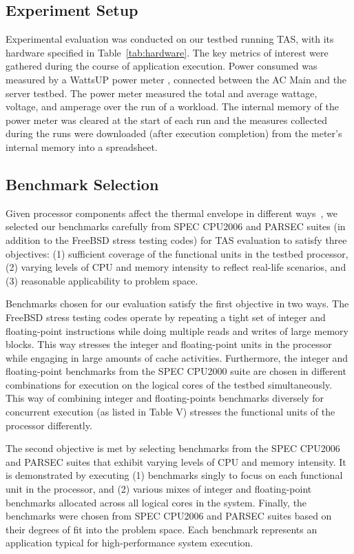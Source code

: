 \documentclass[times, 10pt,twocolumn]{IEEEtran}
\begin{document}
\subsection{Experiment Setup}
\label{sec:experiment-setup} 
Experimental evaluation was conducted on our testbed running TAS, with
its hardware specified in Table~\ref{tab:hardware}.  The key metrics of
interest were gathered during the course of application execution.
Power consumed was measured by a WattsUP power meter
\cite{WattsUp2006a}, connected between the AC Main and the server
testbed.  The power meter measured the total and average wattage,
voltage, and amperage over the run of a workload.  The internal memory
of the power meter was cleared at the start of each run and the measures
collected during the runs were downloaded (after execution completion)
from the meter's internal memory into a spreadsheet.
\subsection{Benchmark Selection}
\label{sec:experimental-setup-1} 
Given processor components affect the thermal envelope in different
ways~\cite{Kumar2008}, we selected our benchmarks carefully from SPEC
CPU2006 and PARSEC suites (in addition to the FreeBSD stress testing
codes) for TAS evaluation to satisfy three objectives: (1) sufficient
coverage of the functional units in the testbed processor, (2) varying
levels of CPU and memory intensity to reflect real-life scenarios, and
(3) reasonable applicability to problem space.

Benchmarks chosen for our evaluation satisfy the first objective in two
ways.  The FreeBSD stress testing codes operate by repeating a tight set
of integer and floating-point instructions while doing multiple reads
and writes of large memory blocks.  This way stresses the integer and
floating-point units in the processor while engaging in large amounts of
cache activities.  Furthermore, the integer and floating-point
benchmarks from the SPEC CPU2000 suite are chosen in different
combinations for execution on the logical cores of the testbed
simultaneously.  This way of combining integer and floating-points
benchmarks diversely for concurrent execution (as listed in Table V)
stresses the functional units of the processor differently.

The second objective is met by selecting benchmarks from the SPEC
CPU2006 and PARSEC suites that exhibit varying levels of CPU and memory
intensity.  It is demonstrated by executing (1) benchmarks singly to
focus on each functional unit in the processor, and (2) various mixes of
integer and floating-point benchmarks allocated across all logical cores
in the system.  Finally, the benchmarks were chosen from SPEC CPU2006
and PARSEC suites based on their degrees of fit into the problem space.
Each benchmark represents an application typical for high-performance
system execution.
\end{document}
